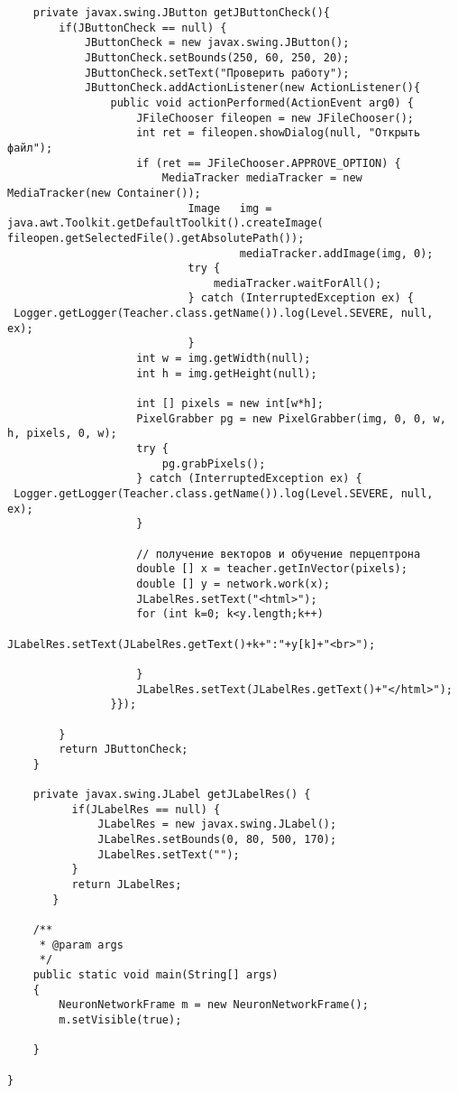 \begin{verbatim}
	private javax.swing.JButton getJButtonCheck(){
		if(JButtonCheck == null) {
			JButtonCheck = new javax.swing.JButton();
			JButtonCheck.setBounds(250, 60, 250, 20);	
			JButtonCheck.setText("Проверить работу");
			JButtonCheck.addActionListener(new ActionListener(){
				public void actionPerformed(ActionEvent arg0) {
					JFileChooser fileopen = new JFileChooser();
					int ret = fileopen.showDialog(null, "Открыть файл");				
					if (ret == JFileChooser.APPROVE_OPTION) {
						MediaTracker mediaTracker = new MediaTracker(new Container());        
							Image	img = java.awt.Toolkit.getDefaultToolkit().createImage(
fileopen.getSelectedFile().getAbsolutePath());
									mediaTracker.addImage(img, 0);
				            try {
				                mediaTracker.waitForAll();
				            } catch (InterruptedException ex) {
 Logger.getLogger(Teacher.class.getName()).log(Level.SEVERE, null, ex);
				            }
					int w = img.getWidth(null);
	                int h = img.getHeight(null);
	 
	                int [] pixels = new int[w*h];
	                PixelGrabber pg = new PixelGrabber(img, 0, 0, w, h, pixels, 0, w);
	                try {
	                    pg.grabPixels();
	                } catch (InterruptedException ex) {
 Logger.getLogger(Teacher.class.getName()).log(Level.SEVERE, null, ex);
	                }
	 
	                // получение векторов и обучение перцептрона
	                double [] x = teacher.getInVector(pixels);
	                double [] y = network.work(x);
	                JLabelRes.setText("<html>");
	                for (int k=0; k<y.length;k++)
	                	JLabelRes.setText(JLabelRes.getText()+k+":"+y[k]+"<br>");
					
					}
					JLabelRes.setText(JLabelRes.getText()+"</html>");
				}});
			
		}
		return JButtonCheck;
	}
	
	private javax.swing.JLabel getJLabelRes() {
	      if(JLabelRes == null) {
	    	  JLabelRes = new javax.swing.JLabel();
	    	  JLabelRes.setBounds(0, 80, 500, 170);
	    	  JLabelRes.setText("");
	      }
	      return JLabelRes;
	   }

	/**
	 * @param args
	 */
	public static void main(String[] args) 
	{
		NeuronNetworkFrame m = new NeuronNetworkFrame();
		m.setVisible(true);

	}

}
\end{verbatim}
